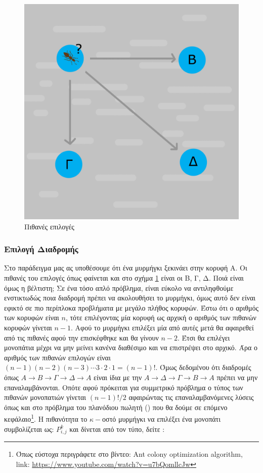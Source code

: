 \begin{figure}
    \centering
    \includegraphics[scale=0.20]{2947_thesis/pictures/epilogi.png} 
    \caption{Πιθανές επιλογές}
    \label{10}
\end{figure}

\subsubsection{Επιλογή Διαδρομής}
\label{3.2.3}
Στο παράδειγμα μας ας υποθέσουμε ότι ένα μυρμήγκι ξεκινάει στην κορυφή Α. Οι πιθανές του επιλογές όπως φαίνεται και στο σχήμα \ref{10} είναι οι Β, Γ, Δ. Ποιά είναι όμως η βέλτιστη; 
Σε ένα τόσο απλό πρόβλημα, είναι εύκολο να αντιληφθούμε ενστικτωδώς ποια διαδρομή πρέπει να ακολουθήσει το μυρμήγκι, όμως αυτό δεν είναι εφικτό σε πιο περίπλοκα προβλήματα με μεγάλο πλήθος κορυφών. Έστω ότι ο αριθμός των κορυφών είναι $n$, τότε επιλέγοντας μία κορυφή ως αρχική ο αριθμός των πιθανών κορυφών γίνεται $n-1$. Αφού το μυρμήγκι επιλέξει μία από αυτές μετά θα αφαιρεθεί από τις πιθανές αφού την επισκέφθηκε και θα γίνουν $n-2$. Έτσι θα επιλέγει μονοπάτια μέχρι να μην μείνει κανένα διαθέσιμο και να επιστρέψει στο αρχικό. Άρα ο αριθμός των πιθανών επιλογών είναι $(n-1)(n-2)(n-3)\cdots3\cdot2\cdot1 = (n-1)!$. Όμως δεδομένου ότι διαδρομές όπως $A \rightarrow B \rightarrow Γ \rightarrow Δ \rightarrow A$ είναι ίδια με την $A \rightarrow Δ \rightarrow Γ \rightarrow B \rightarrow A$ πρέπει να μην επαναλαμβάνονται. Οπότε αφού πρόκειται για συμμετρικό πρόβλημα ο τύπος των πιθανών μονοπατιών γίνεται $(n-1)!/2$ αφαιρώντας τις επαναλαμβανόμενες λύσεις όπως και στο πρόβλημα του πλανόδιου πωλητή () που θα δούμε σε επόμενο κεφάλαιο\footnote{Όπως εύστοχα περιγράφετε στο βίντεο: Ant colony optimization algorithm, \\
link: \url{https://www.youtube.com/watch?v=u7bQomllcJw}}.
Η πιθανότητα το $κ-$οστό μυρμήγκι να επιλέξει ένα μονοπάτι συμβολίζεται ως: $P^k_{i,j}$ και δίνεται από τον τύπο, δείτε \cite{chandrashekar2023hwacoa, blum2005ant}:

